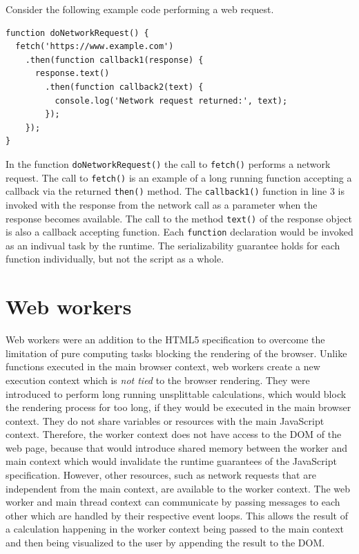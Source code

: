 \documentclass[
	ruledheaders=section,%
	class=report,%
	thesis={type=bachelor},%
	accentcolor=9c,%
	custommargins=true,%
	marginpar=false,%
	parskip=half-,%
	fontsize=11pt,%
]{tudapub}
\begin{document}
  Consider the following example code performing a web request.
\begin{lstlisting}
function doNetworkRequest() {
  fetch('https://www.example.com')
    .then(function callback1(response) {
      response.text()
        .then(function callback2(text) {
          console.log('Network request returned:', text);
        });
    });
}
\end{lstlisting}
  In the function \texttt{doNetworkRequest()} the call to \texttt{fetch()} performs a network request. The call to \texttt{fetch()} is an example of a long running function accepting a callback via the returned \texttt{then()} method. The \texttt{callback1()} function in line 3 is invoked with the response from the network call as a parameter when the response becomes available. The call to the method \texttt{text()} of the response object is also a callback accepting function. Each \texttt{function} declaration would be invoked as an indivual task by the runtime. The serializability guarantee holds for each function individually, but not the script as a whole.
  
  \section{Web workers}
  \label{sec:web-workers}

  Web workers were an addition to the HTML5 specification to overcome the limitation of pure computing tasks blocking the rendering of the browser. Unlike functions executed in the main browser context, web workers create a new execution context which is \textit{not tied} to the browser rendering. They were introduced to perform long running unsplittable calculations, which would block the rendering process for too long, if they would be executed in the main browser context. They do not share variables or resources with the main JavaScript context. Therefore, the worker context does not have access to the DOM of the web page, because that would introduce shared memory between the worker and main context which would invalidate the runtime guarantees of the JavaScript specification. However, other resources, such as network requests that are independent from the main context, are available to the worker context. The web worker and main thread context can communicate by passing messages to each other which are handled by their respective event loops. This allows the result of a calculation happening in the worker context being passed to the main context and then being visualized to the user by appending the result to the DOM.
\end{document}
